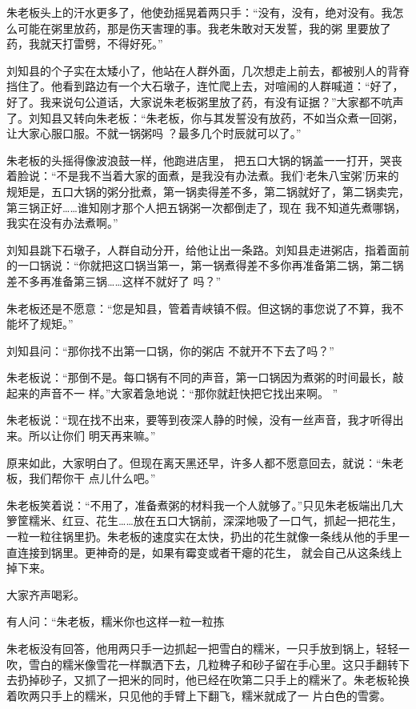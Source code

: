 \documentclass{article}
\begin{document}
朱老板头上的汗水更多了，他使劲摇晃着两只手：“没有，没有，绝对没有。我怎么可能在粥里放药，那是伤天害理的事。我老朱敢对天发誓，我的粥
里要放了药，我就天打雷劈，不得好死。” 

刘知县的个子实在太矮小了，他站在人群外面，几次想走上前去，都被别人的背脊挡住了。他看到路边有一个大石墩子，连忙爬上去，对喧闹的人群喊道：“好了，好了。我来说句公道话，大家说朱老板粥里放了药，有没有证据？”大家都不吭声了。刘知县又转向朱老板：“朱老板，你与其发誓没有放药，不如当众煮一回粥，让大家心服口服。不就一锅粥吗
？最多几个时辰就可以了。” 

朱老板的头摇得像波浪鼓一样，他跑进店里，
\newpage
把五口大锅的锅盖一一打开，哭丧着脸说：“不是我不当着大家的面煮，是我没有办法煮。我们‘老朱八宝粥’历来的规矩是，五口大锅的粥分批煮，第一锅卖得差不多，第二锅就好了，第二锅卖完，第三锅正好……谁知刚才那个人把五锅粥一次都倒走了，现在
我不知道先煮哪锅，我实在没有办法煮啊。” 

刘知县跳下石墩子，人群自动分开，给他让出一条路。刘知县走进粥店，指着面前的一口锅说：“你就把这口锅当第一，第一锅煮得差不多你再准备第二锅，第二锅差不多再准备第三锅……这样不就好了
吗？” 

朱老板还是不愿意：“您是知县，管着青峡镇不假。但这锅的事您说了不算，我不能坏了规矩。”

刘知县问：“那你找不出第一口锅，你的粥店
不就开不下去了吗？” 

朱老板说：“那倒不是。每口锅有不同的声音，第一口锅因为煮粥的时间最长，敲起来的声音不一
\newpage
样。”大家着急地说：“那你就赶快把它找出来啊。
” 

朱老板说：“现在找不出来，要等到夜深人静的时候，没有一丝声音，我才听得出来。所以让你们
明天再来嘛。” 

原来如此，大家明白了。但现在离天黑还早，许多人都不愿意回去，就说：“朱老板，我们帮你干
点儿什么吧。” 

朱老板笑着说：“不用了，准备煮粥的材料我一个人就够了。”只见朱老板端出几大箩筐糯米、红豆、花生……放在五口大锅前，深深地吸了一口气，抓起一把花生，一粒一粒往锅里扔。朱老板的速度实在太快，扔出的花生就像一条线从他的手里一直连接到锅里。更神奇的是，如果有霉变或者干瘪的花生，
就会自己从这条线上掉下来。 


大家齐声喝彩。 

\newpage

有人问：“朱老板，糯米你也这样一粒一粒拣

朱老板没有回答，他用两只手一边抓起一把雪白的糯米，一只手放到锅上，轻轻一吹，雪白的糯米像雪花一样飘洒下去，几粒稗子和砂子留在手心里。这只手翻转下去扔掉砂子，又抓了一把米的同时，他已经在吹第二只手上的糯米了。朱老板轮换着吹两只手上的糯米，只见他的手臂上下翻飞，糯米就成了一
片白色的雪雾。 
\end{document}
